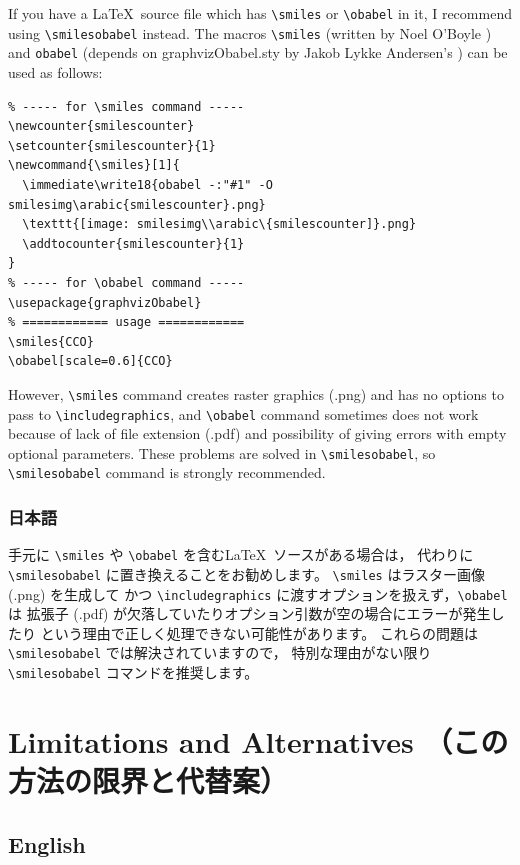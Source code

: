 \documentclass[12pt]{ltjsarticle}
\begin{document}
If you have a \LaTeX\ source file which has \verb|\smiles| or
\verb|\obabel| in it, I recommend using \verb|\smilesobabel| instead.
The macros \verb|\smiles| (written by Noel O'Boyle \cite{NOB1}) and
\verb|obabel| (depends on \textsf{graphvizObabel.sty} by
Jakob Lykke Andersen's \cite{JLA}) can be used as follows:
\begin{verbatim}
% ----- for \smiles command -----
\newcounter{smilescounter}
\setcounter{smilescounter}{1}
\newcommand{\smiles}[1]{
  \immediate\write18{obabel -:"#1" -O smilesimg\arabic{smilescounter}.png}
  \texttt{[image: smilesimg\\arabic\{smilescounter]}.png}
  \addtocounter{smilescounter}{1}
}
% ----- for \obabel command -----
\usepackage{graphvizObabel}
% ============ usage ============
\smiles{CCO}
\obabel[scale=0.6]{CCO}
\end{verbatim}
However, \verb|\smiles| command creates raster graphics (.png) and
has no options to pass to \verb|\includegraphics|, and \verb|\obabel| command
sometimes does not work because of lack of file extension (.pdf) and
possibility of giving errors with empty optional parameters.
These problems are solved in \verb|\smilesobabel|, so
\verb|\smilesobabel| command is strongly recommended.

\subsubsection{日本語}

手元に \verb|\smiles| や \verb|\obabel| を含む\LaTeX\ ソースがある場合は，
代わりに \verb|\smilesobabel| に置き換えることをお勧めします。
\verb|\smiles| はラスター画像 (.png) を生成して
かつ \verb|\includegraphics| に渡すオプションを扱えず，\verb|\obabel| は
拡張子 (.pdf) が欠落していたりオプション引数が空の場合にエラーが発生したり
という理由で正しく処理できない可能性があります。
これらの問題は \verb|\smilesobabel| では解決されていますので，
特別な理由がない限り \verb|\smilesobabel| コマンドを推奨します。

\clearpage

\section{Limitations and Alternatives （この方法の限界と代替案）}

\subsection{English}
\end{document}
